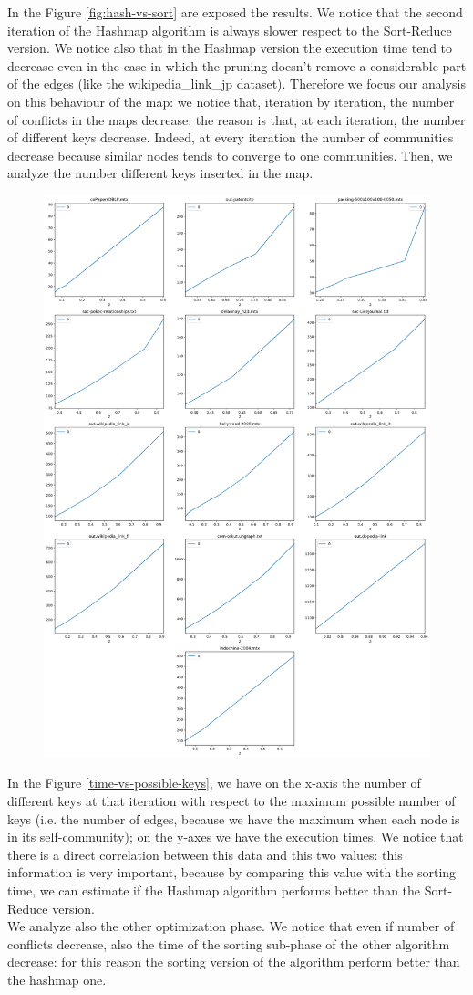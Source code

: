 In the Figure \ref{fig:hash-vs-sort} are exposed the results. We notice that the second iteration of the Hashmap algorithm is always slower respect to the Sort-Reduce version. We notice also that in the Hashmap version the execution time tend to decrease even in the case in which the pruning doesn't remove a considerable part of the edges (like the wikipedia\_link\_jp dataset). Therefore we focus our analysis on this behaviour of the map: we notice that, iteration by iteration, the number of conflicts in the maps decrease: the reason is that, at each iteration, the  number of different keys decrease. Indeed, at every iteration the number of communities decrease because similar nodes tends to converge to one communities. Then, we analyze the number different keys inserted in the map.
\begin{figure}[h]
	\centering
	\includegraphics[width=0.7\linewidth]{0-resources/time-vs-possible-keys}
	\caption{}
	\label{fig:time-vs-possible-keys}
\end{figure}
In the Figure \ref{time-vs-possible-keys}, we have on the x-axis the number of different keys at that iteration with respect to the maximum possible number of keys (i.e. the number of edges, because we have the maximum when each node is in its self-community); on the y-axes we have the execution times. We notice that there is a direct correlation between this data and this two values: this information is very important, because by comparing this value with the sorting time, we can estimate if the Hashmap algorithm performs better than the Sort-Reduce version.\\
We analyze also the other optimization phase. We notice that even if number of conflicts decrease, also the time of the sorting sub-phase of the other algorithm decrease: for this reason the sorting version of the algorithm perform better than the hashmap one.

